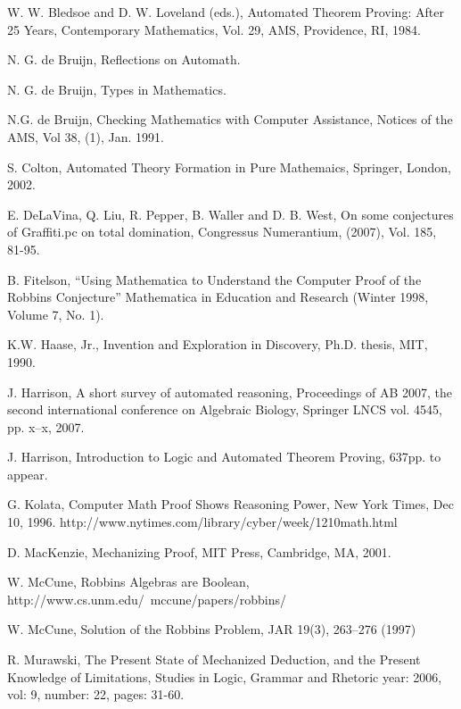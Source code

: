 \documentclass{llncs}
\begin{document}
\begin{thebibliography}{ABCDE}

 W. W. Bledsoe and D. W. Loveland (eds.), Automated
Theorem Proving: After 25 Years, Contemporary Mathematics, Vol. 29,
AMS, Providence, RI, 1984.

 N. G. de Bruijn, Reflections on Automath.

 N. G. de Bruijn, Types in Mathematics.

  N.G. de Bruijn, Checking Mathematics with Computer Assistance, Notices of the AMS,
Vol 38, (1), Jan. 1991.

 S. Colton, Automated Theory Formation in Pure
Mathemaics,  Springer, London, 2002.


 E. DeLaVina, Q. Liu, R. Pepper, B. Waller and D. B. West, On some conjectures of
Graffiti.pc on total domination, Congressus Numerantium, (2007), Vol. 185, 81-95.

  B. Fitelson, ``Using Mathematica to Understand the Computer Proof of the Robbins Conjecture''
Mathematica in Education and Research (Winter 1998, Volume 7, No. 1).

 K.W. Haase, Jr., Invention and Exploration in Discovery,
Ph.D. thesis, MIT, 1990. 

 J. Harrison, A short survey of automated reasoning,
Proceedings of AB 2007, the second international conference on Algebraic Biology, Springer LNCS vol. 4545, pp. x--x, 2007.

 J. Harrison, Introduction to Logic and Automated
Theorem Proving, 637pp. to appear.

 G. Kolata, Computer Math Proof
Shows Reasoning Power, New York Times, Dec 10, 1996.
http://www.nytimes.com/library/cyber/week/1210math.html


 D. MacKenzie, Mechanizing Proof, MIT Press, Cambridge, MA,
2001.

 W. McCune, Robbins Algebras are Boolean, http://www.cs.unm.edu/~mccune/papers/robbins/

 W. McCune, Solution of the Robbins Problem, JAR 19(3), 263--276 (1997)

 R. Murawski, The Present State of Mechanized
Deduction, and the Present Knowledge of Limitations,
Studies in Logic, Grammar and Rhetoric 
year: 2006, vol: 9, number: 22, pages: 31-60.


\end{thebibliography}
\end{document}
